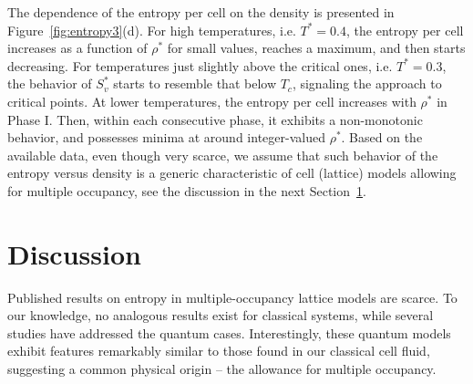 \documentclass[entropy,article,submit,pdftex,moreauthors]{Definitions/mdpi}
\begin{document}
The dependence of the entropy per cell on the density is presented in Figure~\ref{fig:entropy3}(d). For high temperatures, i.e. $T^*=0.4$, the entropy per cell increases as a function of $\rho^*$ for small values, reaches a maximum, and then starts decreasing. For temperatures just slightly above the critical ones, i.e. $T^*=0.3$, the behavior of $S^*_v$ starts to resemble that below $T_c$, signaling the approach to critical points. At lower temperatures, the entropy per cell increases with $\rho^*$ in Phase I. Then, within each consecutive phase, it exhibits a non-monotonic behavior, and possesses minima at around integer-valued $\rho^*$.
Based on the available data, even though very scarce, we assume that such behavior of the entropy versus density is a generic characteristic of cell (lattice) models allowing for multiple occupancy, see the discussion in the next Section~\ref{sec:dis}.

\section{Discussion}\label{sec:dis}
Published results on entropy in multiple-occupancy lattice models are scarce. To our knowledge, no analogous results exist for classical systems, while several studies have addressed the quantum cases. Interestingly, these quantum models exhibit features remarkably similar to those found in our classical cell fluid, suggesting a common physical origin -- the allowance for multiple occupancy. 
\end{document}
